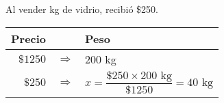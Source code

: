 Al vender \fillin[$40$][1cm] kg de vidrio, recibió \$250.

\begin{solutionbox}{2.1cm}\scriptsize
    \begin{tabular}{r>{\centering}p{0.2cm}l}
        \textbf{Precio} &               & \textbf{Peso}                                                  \\
        \hline
        $\$1250$        & $\Rightarrow$ & $200$ kg                                                       \\
        $\$250$         & $\Rightarrow$ & $x=\dfrac{\$250  \times 200 \text{ kg}}{\$1250}=40 \text{ kg}$ \\
    \end{tabular}
\end{solutionbox}

